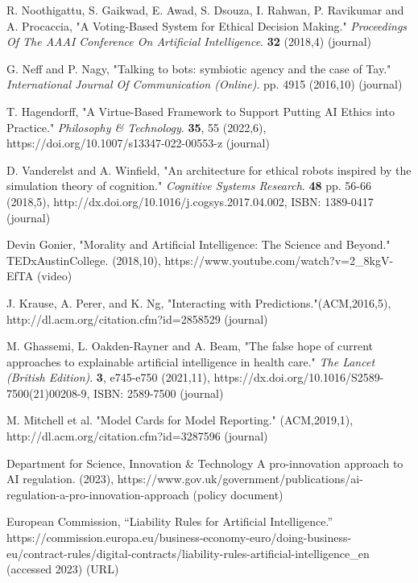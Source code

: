 \documentclass[10pt]{article}
\begin{document}
\begin{thebibliography}{1}
R. Noothigattu, S. Gaikwad, E. Awad, S. Dsouza, I. Rahwan, P. Ravikumar and A. Procaccia, "A Voting-Based System for Ethical Decision Making." {\em Proceedings Of The AAAI Conference On Artificial Intelligence}. \textbf{32} (2018,4) (journal)


G. Neff and P. Nagy, "Talking to bots: symbiotic agency and the case of Tay." {\em International Journal Of Communication (Online)}. pp. 4915 (2016,10) (journal)

T. Hagendorff, "A Virtue-Based Framework to Support Putting AI Ethics into Practice." {\em Philosophy \& Technology}. \textbf{35}, 55 (2022,6), https://doi.org/10.1007/s13347-022-00553-z  (journal)


D. Vanderelst and A. Winfield, "An architecture for ethical robots inspired by the simulation theory of cognition." {\em Cognitive Systems Research}. \textbf{48} pp. 56-66 (2018,5), http://dx.doi.org/10.1016/j.cogsys.2017.04.002, ISBN: 1389-0417  (journal)


Devin Gonier, "Morality and Artificial Intelligence: The Science and Beyond." TEDxAustinCollege.  (2018,10), https://www.youtube.com/watch?v=2\_8kgV-EfTA  (video)


J. Krause, A. Perer, and K. Ng, "Interacting with Predictions."(ACM,2016,5), http://dl.acm.org/citation.cfm?id=2858529  (journal)

M. Ghassemi, L. Oakden-Rayner and A. Beam, "The false hope of current approaches to explainable artificial intelligence in health care." {\em The Lancet (British Edition)}. \textbf{3}, e745-e750 (2021,11), https://dx.doi.org/10.1016/S2589-7500(21)00208-9, ISBN: 2589-7500  (journal)

M. Mitchell et al. "Model Cards for Model Reporting." (ACM,2019,1), http://dl.acm.org/citation.cfm?id=3287596 (journal)


Department for Science, Innovation \& Technology A pro-innovation approach to AI regulation. (2023), https://www.gov.uk/government/publications/ai-regulation-a-pro-innovation-approach (policy document)

European Commission, “Liability Rules for Artificial Intelligence.” https://commission.europa.eu/business-economy-euro/doing-business-eu/contract-rules/digital-contracts/liability-rules-artificial-intelligence\_en (accessed 2023) (URL)

\end{thebibliography}\vspace*{-8pt}
\end{document}
